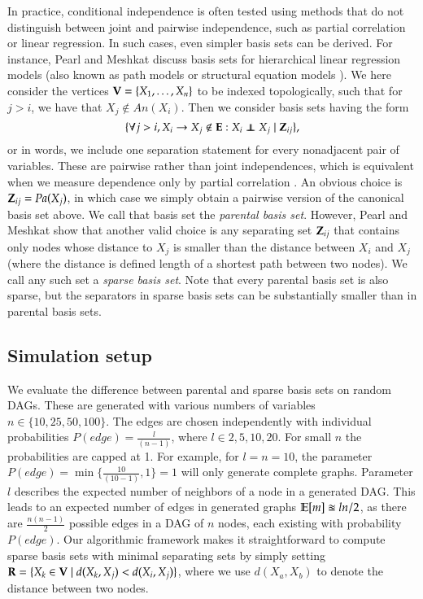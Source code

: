In practice, conditional independence is often tested using methods that do not distinguish between joint and pairwise independence, such as partial correlation or linear regression. In such cases, even simpler basis sets can be derived. For instance, Pearl and Meshkat \cite{PearlMeshkat1999} discuss basis sets for hierarchical linear regression models (also known as path models or structural equation models \cite{Thoemmes2017}). We here consider the vertices ${\bf V}=\{X_1,\ldots,X_n\}$ to be indexed topologically, such that for $j > i$, we have that $X_j \notin \textit{An}(X_i)$. Then we consider basis sets having the form 
$$
\{ \forall j > i, X_i \to X_j \notin \bE  : X_i \independent X_j \mid \bZ_{ij} \},
$$
or in words, we include one separation statement for every nonadjacent pair of variables. These are pairwise rather than joint independences, which is equivalent when we measure dependence only by partial correlation \cite{PearlMeshkat1999}. An obvious choice is ${\bf Z}_{ij}=\textit{Pa}(X_j)$, in which case we simply obtain a pairwise version of the canonical basis set above. We call that basis set the \emph{parental basis set}. However, Pearl and Meshkat show that another valid choice is any separating set ${\bf Z}_{ij}$ that contains only nodes whose distance to $X_j$ is smaller than the distance between $X_i$ and $X_j$ (where the distance is defined length of a shortest path between two nodes). We call any such set a \emph{sparse basis set}. Note that every parental basis set is also sparse, but the separators in sparse basis sets can be substantially smaller than in parental basis sets.

\subsection{Simulation setup}

We evaluate the difference between parental and sparse basis sets on random DAGs. These are generated with 
various numbers of variables $ n \in \{10, 25, 50, 100\}$.
The edges are chosen independently with individual probabilities $P(\textit{edge})=\frac{l}{(n-1)}$, where $l \in 2,5,10,20$. For small $n$ the probabilities are capped at 1. 
For example, for $l= n = 10$, the parameter $P(\textit{edge}) = \min\{\frac{10}{(10-1)}, 1\} =1$ will only generate complete graphs.
Parameter $l$ describes the expected number of neighbors of a node in a generated DAG.
This  leads to an expected number of edges in generated graphs $\operatorname{\mathbb{E}}[m] \approxeq l n / 2$, 
 as there are $ \frac{n (n-1)}{2} $ 
possible edges in a DAG of $n$ nodes, each existing with probability $P(\textit{edge})$. Our algorithmic framework makes it straightforward to compute sparse basis sets with minimal separating sets by simply setting ${\bf R} = \{ X_k \in {\bf V} \mid d(X_k,X_j) < d(X_i, X_j)\}$, where we use $d(X_a, X_b)$ to denote the distance between two nodes. 

